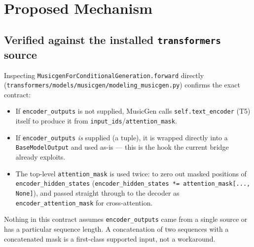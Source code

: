 \documentclass[11pt]{article}
\begin{document}
\section{Proposed Mechanism}
\label{sec:mechanism}

\subsection{Verified against the installed \texttt{transformers} source}
Inspecting \texttt{MusicgenForConditionalGeneration.forward} directly
(\texttt{transformers/models/musicgen/modeling\_musicgen.py}) confirms the exact contract:
\begin{itemize}
\item If \texttt{encoder\_outputs} is not supplied, MusicGen calls \texttt{self.text\_encoder}
(T5) itself to produce it from \texttt{input\_ids}/\texttt{attention\_mask}.
\item If \texttt{encoder\_outputs} \emph{is} supplied (a tuple), it is wrapped directly into a
\texttt{BaseModelOutput} and used as-is --- this is the hook the current bridge already exploits.
\item The top-level \texttt{attention\_mask} is used twice: to zero out masked positions of
\texttt{encoder\_hidden\_states} (\texttt{encoder\_hidden\_states *= attention\_mask[..., None]}),
and passed straight through to the decoder as \texttt{encoder\_attention\_mask} for
cross-attention.
\end{itemize}
Nothing in this contract assumes \texttt{encoder\_outputs} came from a single source or has a
particular sequence length. A concatenation of two sequences with a concatenated mask is a
first-class supported input, not a workaround.
\end{document}

